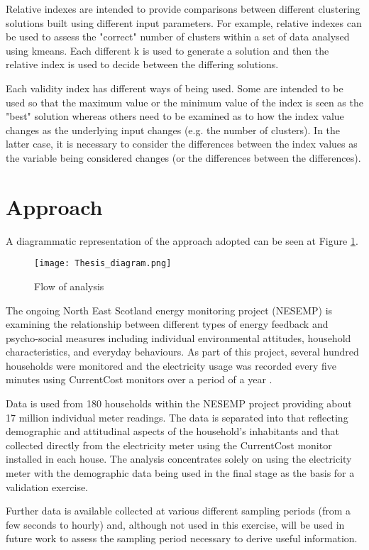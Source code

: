 \documentclass[conference]{IEEEtran}
\begin{document}
Relative indexes are intended to provide comparisons between different clustering solutions built using different input parameters. For example, relative indexes can be used to assess the "correct" number of clusters within a set of data analysed using kmeans. Each different k is used to generate a solution and then the relative index is used to decide between the differing solutions.

Each validity index has different ways of being used. Some are intended to be used so that the maximum value or the minimum value of the index is seen as the "best" solution whereas others need to be examined as to how the index value changes as the underlying input changes (e.g. the number of clusters). In the latter case, it is necessary to consider the differences between the index values as the variable being considered changes (or the differences between the differences).

\section{Approach}
A diagrammatic representation of the approach adopted can be seen at Figure \ref{analysis}.

\begin{figure}[h]
\centering
\texttt{[image: Thesis\_diagram.png]}
\caption{Flow of analysis}
\label{analysis}
\end{figure}

The ongoing North East Scotland energy monitoring project (NESEMP) is examining the relationship between different types of energy feedback and psycho-social measures including individual environmental attitudes, household characteristics, and everyday behaviours.  As part of this project, several hundred households were monitored and the electricity usage was recorded every five minutes using CurrentCost monitors over a period of a year \cite{Craig2012}.

Data is used from 180 households within the NESEMP project providing about 17 million individual meter readings. The data is separated into that reflecting demographic and attitudinal aspects of the household's inhabitants and that collected directly from the electricity meter using the CurrentCost monitor installed in each house. The analysis concentrates solely on using the electricity meter with the demographic data being used in the final stage as the basis for a validation exercise.

Further data is available collected at various different sampling periods (from a few seconds to hourly) and, although not used in this exercise, will be used in future work to assess the sampling period necessary to derive useful information.
\end{document}
